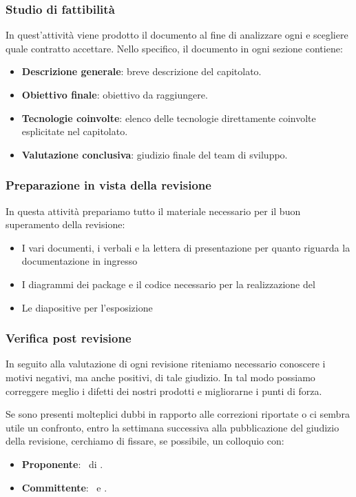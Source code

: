         \subsubsection{Studio di fattibilità}\label{PP:Fornitura:SdF}
        In quest'attività viene prodotto il documento \Doc{\SdFv} al fine di analizzare ogni  e scegliere quale contratto accettare.
        Nello specifico, il documento in ogni sezione contiene:
        	\begin{itemize}
        		\item \textbf{Descrizione generale}: breve descrizione del capitolato.
        		\item \textbf{Obiettivo finale}: obiettivo da raggiungere.
        		\item \textbf{Tecnologie coinvolte}: elenco delle tecnologie direttamente coinvolte esplicitate nel capitolato.
        		\item \textbf{Valutazione conclusiva}: giudizio finale del team di sviluppo.
        	\end{itemize}

        \subsubsection{Preparazione in vista della revisione}
		In questa attività prepariamo tutto il materiale necessario per il buon superamento della revisione:
		\begin{itemize}
			\item I vari documenti, i verbali e la lettera di presentazione per quanto riguarda la documentazione in ingresso
			\item I diagrammi dei package e il codice necessario per la realizzazione del 
			\item Le diapositive per l'esposizione
		\end{itemize}

        \subsubsection{Verifica post revisione}
        In seguito alla valutazione di ogni revisione riteniamo necessario conoscere i motivi negativi, ma anche positivi, di tale giudizio. In tal modo possiamo correggere meglio i difetti dei nostri prodotti e migliorarne i punti di forza. \par
        Se sono presenti molteplici dubbi in rapporto alle correzioni riportate o ci sembra utile un confronto, entro la settimana successiva alla pubblicazione del giudizio della revisione, cerchiamo di fissare, se possibile, un colloquio con:
        \begin{itemize}
            \item \textbf{Proponente}: \DZ\ di \II.
            \item \textbf{Committente}: \TV\ e \RC.
		\end{itemize}

